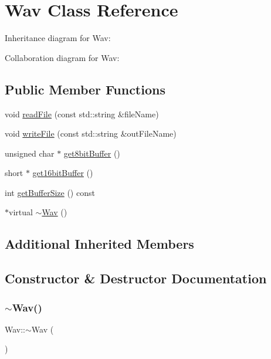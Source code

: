 \hypertarget{classWav}{}\section{Wav Class Reference}
\label{classWav}


Inheritance diagram for Wav\+:


Collaboration diagram for Wav\+:
\subsection*{Public Member Functions}
\begin{DoxyCompactItemize}
\item 
void \hyperlink{classWav_a1c4230cec49d30147a5b8a1950083f7c}{read\+File} (const std\+::string \&file\+Name)
\item 
void \hyperlink{classWav_ad86f4a21d36719ae375ea2586f9f591f}{write\+File} (const std\+::string \&out\+File\+Name)
\item 
unsigned char $\ast$ \hyperlink{classWav_a998e6927c64d21c466c0ed552a889757}{get8bit\+Buffer} ()
\item 
short $\ast$ \hyperlink{classWav_a1ec518bcccf38dbd25dd71b3a2b6dfd9}{get16bit\+Buffer} ()
\item 
int \hyperlink{classWav_a71fdfa1d9f5e7c1b86f07bbff4249dca}{get\+Buffer\+Size} () const
\item 
$\ast$virtual \hyperlink{classWav_a1510b246ba121b103a60b8e7839af25f}{$\sim$\+Wav} ()
\end{DoxyCompactItemize}
\subsection*{Additional Inherited Members}


\subsection{Constructor \& Destructor Documentation}
\mbox{\label{classWav_a1510b246ba121b103a60b8e7839af25f}} 
\subsubsection{\texorpdfstring{$\sim$\+Wav()}{~Wav()}}
{\footnotesize\ttfamily Wav\+::$\sim$\+Wav (\begin{DoxyParamCaption}{ }\end{DoxyParamCaption})\hspace{0.3cm}{\ttfamily [virtual]}}

